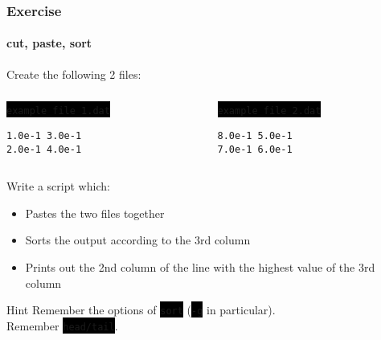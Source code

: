 \documentclass[unknownkeysallowed, 10pt, a4 paper, handout]{beamer}
\newcommand{\code}[1]{\colorbox{black}{\color{green}\texttt{#1}}}
\begin{document}
\begin{frame}[fragile=singleslide]
  \frametitle{Exercise}
  \framesubtitle{cut, paste, sort}

  \begin{block}{}
    Create the following 2 files:
    \begin{columns}
      \begin{column}{0.50\textwidth}
        \code{example\_file\_1.dat}
        \begin{verbatim}
1.0e-1 3.0e-1
2.0e-1 4.0e-1
        \end{verbatim}
      \end{column}
      \begin{column}{0.50\textwidth}
        \code{example\_file\_2.dat}
        \begin{verbatim}
8.0e-1 5.0e-1
7.0e-1 6.0e-1
        \end{verbatim}
      \end{column}
    \end{columns}
  \end{block}

  \begin{exampleblock}{Write a script which:}
    \begin{itemize}
      \item Pastes the two files together
      \item Sorts the output according to the 3rd column
      \item Prints out the 2nd column of the line
        with the highest value of the 3rd column
    \end{itemize}
  \end{exampleblock}
  \begin{alertblock}{Hint}
    Remember the options of \code{sort} (\code{-g} in particular).\\
    Remember \code{head/tail}.
  \end{alertblock}
\end{frame}
\end{document}
